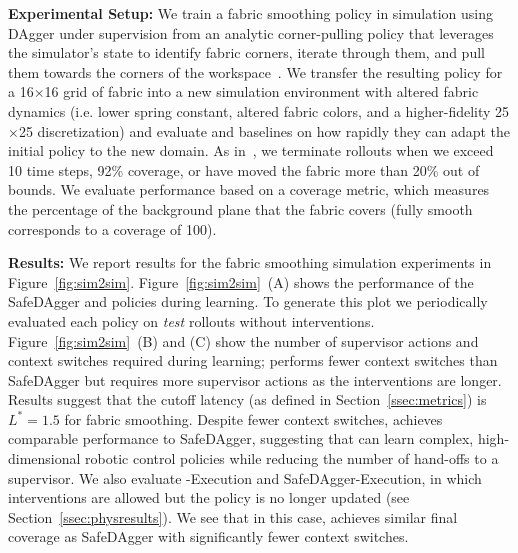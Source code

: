 \textbf{Experimental Setup: }
We train a fabric smoothing policy in simulation using DAgger under supervision from an analytic corner-pulling policy that leverages the simulator's state to identify fabric corners, iterate through them, and pull them towards the corners of the workspace~\cite{seita_fabrics_2020}. We transfer the resulting policy for a 16$\times$16 grid of fabric into a new simulation environment with altered fabric dynamics (i.e. lower spring constant, altered fabric colors, and a higher-fidelity 25$\times$25 discretization) and evaluate \algname and baselines on how rapidly they can adapt the initial policy to the new domain. As in~\cite{seita_fabrics_2020}, we terminate rollouts when we exceed 10 time steps, 92\% coverage, or have moved the fabric more than 20\% out of bounds. We evaluate performance based on a coverage metric, which measures the percentage of the background plane that the fabric covers (fully smooth corresponds to a coverage of 100).

\textbf{Results: }
We report results for the fabric smoothing simulation experiments in Figure~\ref{fig:sim2sim}. Figure~\ref{fig:sim2sim}~(A) shows the performance of the SafeDAgger and \algname policies during learning. To generate this plot we periodically evaluated each policy on \emph{test} rollouts without interventions. Figure~\ref{fig:sim2sim}~(B) and (C) show the number of supervisor actions and context switches required during learning; \algname performs fewer context switches than SafeDAgger but requires more supervisor actions as the interventions are longer. Results suggest that the cutoff latency (as defined in Section~\ref{ssec:metrics}) is $L^*=1.5$ for fabric smoothing. Despite fewer context switches, \algname achieves comparable performance to SafeDAgger, suggesting that \algname can learn complex, high-dimensional robotic control policies while reducing the number of hand-offs to a supervisor. We also evaluate \algname-Execution and SafeDAgger-Execution, in which interventions are allowed but the policy is no longer updated (see Section~\ref{ssec:physresults}). We see that in this case, \algname achieves similar final coverage as SafeDAgger with significantly fewer context switches. 

